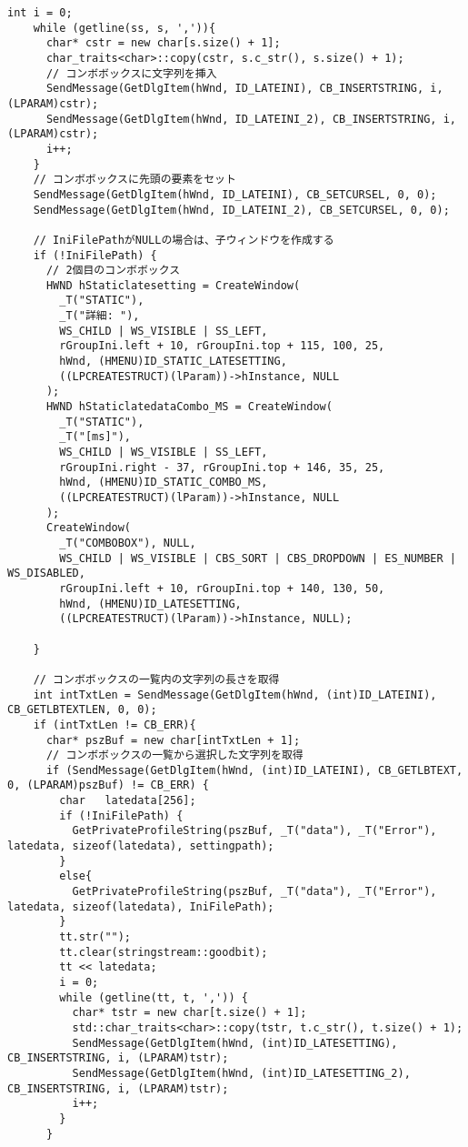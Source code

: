 \begin{lstlisting}[caption=window.cpp]
    int i = 0;
    while (getline(ss, s, ',')){
      char* cstr = new char[s.size() + 1];
      char_traits<char>::copy(cstr, s.c_str(), s.size() + 1);
      // コンボボックスに文字列を挿入
      SendMessage(GetDlgItem(hWnd, ID_LATEINI), CB_INSERTSTRING, i, (LPARAM)cstr);
      SendMessage(GetDlgItem(hWnd, ID_LATEINI_2), CB_INSERTSTRING, i, (LPARAM)cstr);
      i++;
    }
    // コンボボックスに先頭の要素をセット
    SendMessage(GetDlgItem(hWnd, ID_LATEINI), CB_SETCURSEL, 0, 0);
    SendMessage(GetDlgItem(hWnd, ID_LATEINI_2), CB_SETCURSEL, 0, 0);

    // IniFilePathがNULLの場合は、子ウィンドウを作成する
    if (!IniFilePath) {
      // 2個目のコンボボックス
      HWND hStaticlatesetting = CreateWindow(
        _T("STATIC"),
        _T("詳細: "),
        WS_CHILD | WS_VISIBLE | SS_LEFT,
        rGroupIni.left + 10, rGroupIni.top + 115, 100, 25,
        hWnd, (HMENU)ID_STATIC_LATESETTING,
        ((LPCREATESTRUCT)(lParam))->hInstance, NULL
      );
      HWND hStaticlatedataCombo_MS = CreateWindow(
        _T("STATIC"),
        _T("[ms]"),
        WS_CHILD | WS_VISIBLE | SS_LEFT,
        rGroupIni.right - 37, rGroupIni.top + 146, 35, 25,
        hWnd, (HMENU)ID_STATIC_COMBO_MS,
        ((LPCREATESTRUCT)(lParam))->hInstance, NULL
      );
      CreateWindow(
        _T("COMBOBOX"), NULL,
        WS_CHILD | WS_VISIBLE | CBS_SORT | CBS_DROPDOWN | ES_NUMBER | WS_DISABLED,
        rGroupIni.left + 10, rGroupIni.top + 140, 130, 50,
        hWnd, (HMENU)ID_LATESETTING,
        ((LPCREATESTRUCT)(lParam))->hInstance, NULL);

    }

    // コンボボックスの一覧内の文字列の長さを取得
    int intTxtLen = SendMessage(GetDlgItem(hWnd, (int)ID_LATEINI), CB_GETLBTEXTLEN, 0, 0);
    if (intTxtLen != CB_ERR){
      char* pszBuf = new char[intTxtLen + 1];
      // コンボボックスの一覧から選択した文字列を取得
      if (SendMessage(GetDlgItem(hWnd, (int)ID_LATEINI), CB_GETLBTEXT, 0, (LPARAM)pszBuf) != CB_ERR) {
        char   latedata[256];
        if (!IniFilePath) {
          GetPrivateProfileString(pszBuf, _T("data"), _T("Error"), latedata, sizeof(latedata), settingpath);
        }
        else{
          GetPrivateProfileString(pszBuf, _T("data"), _T("Error"), latedata, sizeof(latedata), IniFilePath);
        }
        tt.str("");
        tt.clear(stringstream::goodbit);
        tt << latedata;
        i = 0;
        while (getline(tt, t, ',')) {
          char* tstr = new char[t.size() + 1];
          std::char_traits<char>::copy(tstr, t.c_str(), t.size() + 1);
          SendMessage(GetDlgItem(hWnd, (int)ID_LATESETTING), CB_INSERTSTRING, i, (LPARAM)tstr);
          SendMessage(GetDlgItem(hWnd, (int)ID_LATESETTING_2), CB_INSERTSTRING, i, (LPARAM)tstr);
          i++;
        }
      }


\end{lstlisting}
